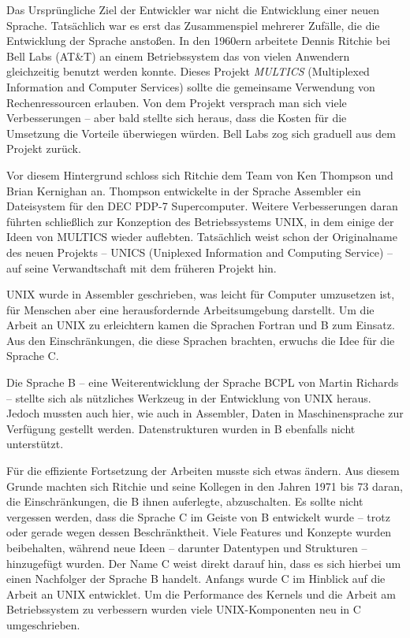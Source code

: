\begin{appendices}
Das Ursprüngliche Ziel der Entwickler war nicht die Entwicklung einer neuen Sprache. Tatsächlich war es erst das Zusammenspiel mehrerer Zufälle, die die Entwicklung der Sprache anstoßen. In den 1960ern arbeitete Dennis Ritchie bei Bell Labs (AT\&T) an einem Betriebssystem das von vielen Anwendern gleichzeitig benutzt werden konnte. Dieses Projekt \emph{MULTICS} (Multiplexed Information and Computer Services) sollte die gemeinsame Verwendung von Rechenressourcen erlauben. Von dem Projekt versprach man sich viele Verbesserungen -- aber bald stellte sich heraus, dass die Kosten für die Umsetzung die Vorteile überwiegen würden. Bell Labs zog sich graduell aus dem Projekt zurück.

Vor diesem Hintergrund schloss sich Ritchie dem Team von Ken Thompson und Brian Kernighan an. Thompson entwickelte in der Sprache Assembler ein Dateisystem für den DEC PDP-7 Supercomputer. Weitere Verbesserungen daran führten schließlich zur Konzeption des Betriebssystems UNIX, in dem einige der Ideen von MULTICS wieder auflebten. Tatsächlich weist schon der Originalname des neuen Projekts -- UNICS (Uniplexed Information and Computing Service) -- auf seine Verwandtschaft mit dem früheren Projekt hin.

UNIX wurde in Assembler geschrieben, was leicht für Computer umzusetzen ist, für Menschen aber eine herausfordernde Arbeitsumgebung darstellt. Um die Arbeit an UNIX zu erleichtern kamen die Sprachen Fortran und B zum Einsatz. Aus den Einschränkungen, die diese Sprachen brachten, erwuchs die Idee für die Sprache C.

Die Sprache B -- eine Weiterentwicklung der Sprache BCPL von Martin Richards -- stellte sich als nützliches Werkzeug in der Entwicklung von UNIX heraus. Jedoch mussten auch hier, wie auch in Assembler, Daten in Maschinensprache zur Verfügung gestellt werden. Datenstrukturen wurden in B ebenfalls nicht unterstützt.

Für die effiziente Fortsetzung der Arbeiten musste sich etwas ändern. Aus diesem Grunde machten sich Ritchie und seine Kollegen in den Jahren 1971 bis 73 daran, die Einschränkungen, die B ihnen auferlegte, abzuschalten. Es sollte nicht vergessen werden, dass die Sprache C im Geiste von B entwickelt wurde -- trotz oder gerade wegen dessen Beschränktheit. Viele Features und Konzepte wurden beibehalten, während neue Ideen -- darunter Datentypen und Strukturen -- hinzugefügt wurden. Der Name C weist direkt darauf hin, dass es sich hierbei um einen Nachfolger der Sprache B handelt. Anfangs wurde C im Hinblick auf die Arbeit an UNIX entwicklet. Um die Performance des Kernels und die Arbeit am Betriebssystem zu verbessern wurden viele UNIX-Komponenten neu in C umgeschrieben.


\end{appendices}
